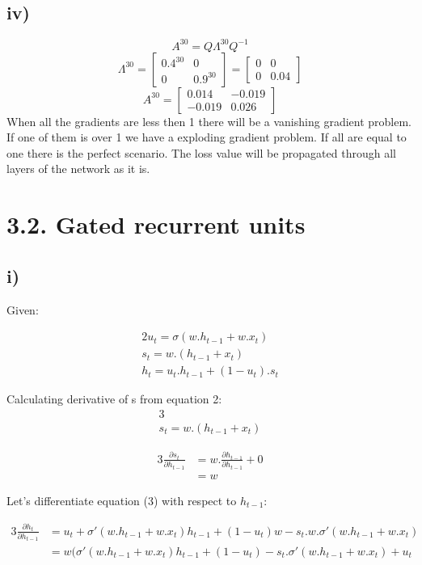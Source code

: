 \subsection*{iv)}
\[A^{30} = Q\Lambda^{30}Q^{-1}\]
\[\Lambda^{30}=\begin{bmatrix}
    0.4^{30} & 0\\
    0 & 0.9^{30}
\end{bmatrix} =
\begin{bmatrix}
    0 & 0\\
    0 & 0.04
\end{bmatrix}\]
\[A^{30} = \begin{bmatrix}
    0.014 & -0.019\\
    -0.019 & 0.026
\end{bmatrix}\]
When all the gradients are less then 1 there will be a vanishing  gradient problem. If one of them is over 1 we have a exploding gradient problem. If all are equal to one there is the perfect scenario. The loss value will be propagated through all layers of the network as it is.
\section*{3.2. Gated recurrent units}
\subsection*{i)}

Given:

\begin{alignat}{2}
u_t = \sigma (w.h_{t-1} + w.x_t)
\\s_t = w. (h_{t-1} + x_t)
\\h_t = u_t. h_{t-1}  + (1-u_t) . s_t
\end{alignat}

Calculating derivative of s from equation 2:
\begin{alignat}{3}
\\s_t = w. (h_{t-1} + x_t)
\end{alignat}

\begin{alignat}{3}
\frac {\partial s_t}{\partial h_{t-1}} &= w.\frac{\partial h_{t-1}}{\partial h_{t-1}} + 0 
\\ &= w
\end{alignat}

Let's differentiate equation (3) with respect to $h_{t-1}$:

\begin{alignat}{3}
\frac {\partial h_t}{\partial h_{t-1}} &= u_t +   \sigma'(w.h_{t-1}+w.x_t)h_{t-1} + (1-u_t)w - s_t.w.\sigma'(w.h_{t-1}+w.x_t)
\\ &= w(\sigma'(w.h_{t-1} + w.x_t)h_{t-1} + (1-u_t) - s_t.\sigma'(w.h_{t-1} + w.x_t) + u_t
\end{alignat}

